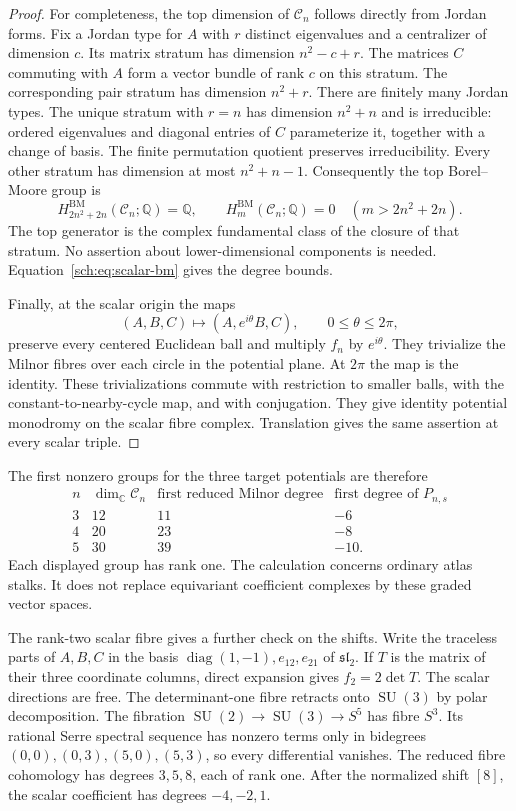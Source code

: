 \begin{proof}
For completeness, the top dimension of $\mathcal C_n$ follows directly
from Jordan forms. Fix a Jordan type for $A$ with $r$ distinct eigenvalues
and a centralizer of dimension $c$. Its matrix stratum has dimension
$n^2-c+r$. The matrices $C$ commuting with $A$ form a vector bundle
of rank $c$ on this stratum. The corresponding pair stratum has
dimension $n^2+r$.
There are finitely many Jordan types. The unique stratum with $r=n$
has dimension $n^2+n$ and is irreducible: ordered eigenvalues and
diagonal entries of $C$ parameterize it, together with a change of basis.
The finite permutation quotient preserves irreducibility.
Every other stratum has dimension at most $n^2+n-1$.
Consequently the top Borel--Moore group is
\[
 H^{\mathrm{BM}}_{2n^2+2n}(\mathcal C_n;\mathbb Q)=\mathbb Q,
 \qquad H^{\mathrm{BM}}_m(\mathcal C_n;\mathbb Q)=0
                 \quad(m>2n^2+2n).
\]
The top generator is the complex fundamental class of the closure
of that stratum. No assertion about lower-dimensional components
is needed. Equation~\eqref{sch:eq:scalar-bm} gives the degree bounds.

Finally, at the scalar origin the maps
\[
 (A,B,C)\longmapsto(A,e^{i\theta}B,C),\qquad0\leq\theta\leq2\pi,
\]
preserve every centered Euclidean ball and multiply $f_n$ by
$e^{i\theta}$. They trivialize the Milnor fibres over each circle
in the potential plane. At $2\pi$ the map is the identity.
These trivializations commute with restriction to smaller balls,
with the constant-to-nearby-cycle map, and with conjugation.
They give identity potential monodromy on the scalar fibre complex.
Translation gives the same assertion at every scalar triple.
\end{proof}

The first nonzero groups for the three target potentials are therefore
\[
\begin{array}{c|c|c|c}
 n&\dim_{\mathbb C}\mathcal C_n&
  \text{first reduced Milnor degree}&\text{first degree of }P_{n,s}\\\hline
 3&12&11&-6\\
 4&20&23&-8\\
 5&30&39&-10.
\end{array}
\]
Each displayed group has rank one. The calculation concerns ordinary
atlas stalks. It does not replace equivariant coefficient complexes
by these graded vector spaces.

The rank-two scalar fibre gives a further check on the shifts.
Write the traceless parts of $A,B,C$ in the basis
$\operatorname{diag}(1,-1),e_{12},e_{21}$ of
$\mathfrak{sl}_2$. If $T$ is the matrix of their three coordinate
columns, direct expansion gives $f_2=2\det T$.
The scalar directions are free. The determinant-one fibre retracts
onto $\operatorname{SU}(3)$ by polar decomposition.
The fibration $\operatorname{SU}(2)\to\operatorname{SU}(3)\to S^5$
has fibre $S^3$. Its rational Serre spectral sequence has nonzero
terms only in bidegrees $(0,0),(0,3),(5,0),(5,3)$, so every
differential vanishes. The reduced fibre cohomology has degrees
$3,5,8$, each of rank one. After the normalized shift $[8]$,
the scalar coefficient has degrees $-4,-2,1$.

